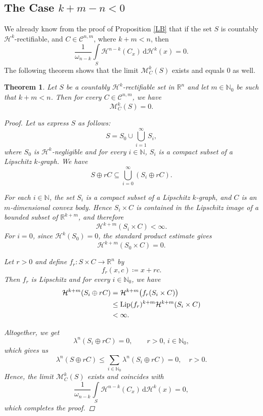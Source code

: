\documentclass[pdflatex,sn-mathphys-num]{sn-jnl}
\theoremstyle{plain}
\newtheorem{theorem}{Theorem}[section]
\theoremstyle{definition}
\newcommand{\dH}[1]{\,\mathrm d\mathcal{H}^{#1}}
\begin{document}
\subsection{The Case $k+m-n<0$}
We already know from the proof of Proposition \ref{LB} that if the set $S$ is countably $\mathcal{H}^k$-rectifiable, and $C\in\mathcal{C}^{n, m}$, where $k+m<n$, then $$\frac{1}{\omega_{n-k}}\int\limits_{S}\mathcal{H}^{n-k}(C_x)\dH{k}(x)=0.$$ 
The following theorem shows that the limit $\mathcal{M}_{C}^k(S)$ exists and equals $0$ as well.
\begin{theorem}
Let $S$ be a countably $\mathcal{H}^k$-rectifiable set in $\mathbb{R}^n$ and let $m\in\mathbb{N}_0$ be such that $k+m<n$. Then for every $C\in\mathcal{C}^{n, m}$, we have $$\mathcal{M}^{k}_C(S)=0.$$
    \begin{proof}
        Let us express $S$ as follows: $$S=S_0\cup\bigcup_{i=1}^{\infty}S_i,$$ where $S_0$ is $\mathcal{H}^k$-negligible and for every $i\in\mathbb N$, $S_i$ is a compact subset of a Lipschitz $k$-graph. We have $$S\oplus rC\subseteq \bigcup_{i=0}^{\infty}(S_i\oplus rC).$$


For each $i\in\mathbb N$, the set $S_i$ is a compact subset of a Lipschitz
$k$-graph, and $C$ is an $m$-dimensional convex body. Hence
$S_i\times C$ is contained in the Lipschitz image of a bounded subset of
$\mathbb R^{k+m}$, and therefore
\[
\mathcal H^{k+m}(S_i\times C)<\infty.
\]
For $i=0$, since $\mathcal H^k(S_0)=0$, the standard product estimate gives
\[
\mathcal H^{k+m}(S_0\times C)=0.
\] 

        Let $r>0$ and define $f_{r}\colon S\times C\to\mathbb{R}^n$ by $$f_{r}(x, c)\coloneq x+rc.$$ Then $f_r$ is Lipschitz and for every $i\in\mathbb{N}_0$, we have \begin{equation*}\begin{split}\mathcal{H}^{k+m}(S_i\oplus rC)&=\mathcal{H}^{k+m}\big(f_r(S_i\times C)\big)\\&\leq\textup{Lip}(f_r)^{k+m}\mathcal{H}^{k+m}(S_i\times C)\\&<\infty.\end{split}\end{equation*}

        Altogether, we get $$\lambda^n(S_i\oplus rC)=0, \qquad r>0, \, i\in\mathbb{N}_0,$$
       which gives us $$\lambda^{n}(S\oplus rC)\leq\sum_{i\in\mathbb{N}_0}\lambda^n(S_i\oplus rC)=0, \quad r>0.$$ Hence, the limit $\mathcal{M}_{C}^k(S)$ exists and coincides with $$\frac{1}{\omega_{n-k}}\int\limits_{S}\mathcal{H}^{n-k}(C_x)\dH{k}(x)=0,$$ which completes the proof.
    \end{proof}
\end{theorem}
\end{document}
